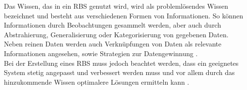 Das Wissen, das in ein RBS genutzt wird, wird als problemlösendes Wissen bezeichnet und besteht aus verschiedenen Formen von Informationen. So können Informationen durch Beobachtungen gesammelt werden, aber auch durch Abstrahierung, Generalisierung oder Kategorisierung von gegebenen Daten. Neben reinen Daten werden auch Verknüpfungen von Daten als relevante Informationen angesehen, sowie Strategien zur Datengewinnung \cite{Hayes-Roth:1985:RS:4284.4286}.\\
Bei der Erstellung eines RBS muss jedoch beachtet werden, dass ein geeignetes System stetig angepasst und verbessert werden muss und vor allem durch das hinzukommende Wissen optimalere Lösungen ermitteln kann \cite{Hayes-Roth:1985:RS:4284.4286}.




